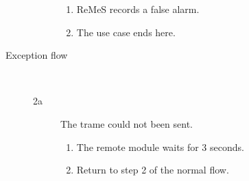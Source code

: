 \begin{description}
\begin{description}
		\begin{enumerate}
			\item ReMeS records a false alarm.
			\item The use case ends here. 
		\end{enumerate}
	\end{description}
	\item[Exception flow] \ 
	\begin{description}
		\item[2a] The trame could not been sent. 
		\begin{enumerate}
			\item The remote module waits for 3 seconds.
			\item Return to step 2 of the normal flow.
		\end{enumerate}
	\end{description}
\end{description}